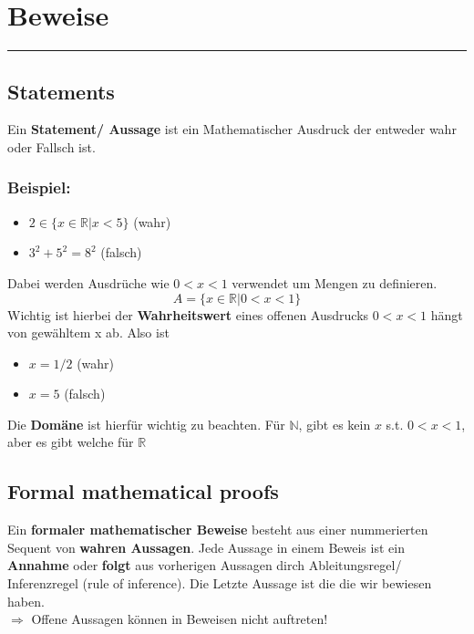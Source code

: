 \newcommand{\defbox}[2]{
\vspace{1cm}
\noindent
  \begin{tcolorbox}[colframe=red, colback=white, width=\linewidth, title=#1]
    #2
  \end{tcolorbox}
  \vspace{1cm}
}

\newcommand{\proofbox}[3]{%
    \begin{proof}
        \\ \textbf{Annahme:}
        \begin{align*}
            #1
        \end{align*}
        \textbf{Zeige:} #2
        \begin{align*}
            #3
        \end{align*}
    \end{proof}%
}


\section{Beweise}
\rule{\textwidth}{0.4pt}
\subsection{Statements} Ein \textbf{Statement/ Aussage} ist ein Mathematischer Ausdruck der entweder wahr oder Fallsch ist. 
\subsubsection*{Beispiel: } 
\begin{itemize}
    \item $2 \in \{x \in \mathbb{R} \vert x < 5\}$ (wahr)
    \item $3^2 + 5^2 = 8^2$ (falsch)
\end{itemize} 
Dabei werden Ausdrüche wie $0 < x < 1$ verwendet um Mengen zu definieren. \[A = \{x\in\mathbb{R} \vert 0 < x < 1\}\] Wichtig ist hierbei der \textbf{Wahrheitswert} eines offenen Ausdrucks $0 < x < 1$ hängt von gewähltem x ab. Also ist 
\begin{itemize}
    \item $x = 1/2$ (wahr) 
    \item $x = 5 $ (falsch)
\end{itemize}
Die \textbf{Domäne} ist hierfür wichtig zu beachten. Für $\mathbb{N}$, gibt es kein $x$ s.t. $0 < x < 1$, aber es gibt welche für $\mathbb{R}$

\subsection{Formal mathematical proofs} Ein \textbf{formaler mathematischer Beweise} besteht aus einer nummerierten Sequent von \textbf{wahren Aussagen}. Jede Aussage in einem Beweis ist ein \textbf{Annahme} oder \textbf{folgt} aus vorherigen Aussagen dirch Ableitungsregel/ Inferenzregel (rule of inference). Die Letzte Aussage ist die die wir bewiesen haben.\\
$\Rightarrow$ Offene Aussagen können in Beweisen nicht auftreten!

